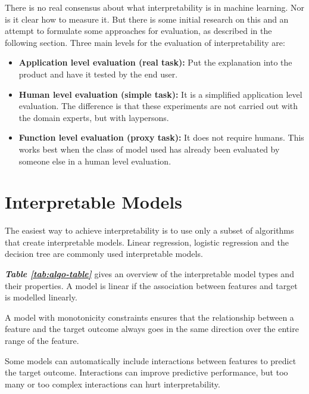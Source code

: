 \documentclass[a4paper, 10pt,]{JournalArticle}
\begin{document}
There is no real consensus about what interpretability is in machine learning. Nor is it clear how to measure it. But there is some initial research on this and an attempt to formulate some approaches for evaluation, as described in the following section.
Three main levels for the evaluation of interpretability are:

\begin{itemize}[] %
\item \textbf{Application level evaluation (real task):} Put the explanation into the product and have it tested by the end user.
\item \textbf{Human level evaluation (simple task):} It is a simplified application level evaluation. The difference is that these experiments are not carried out with the domain experts, but with laypersons.
\item \textbf{Function level evaluation (proxy task):} It does not require humans. This works best when the class of model used has already been evaluated by someone else in a human level evaluation.
\end{itemize}


\section{Interpretable Models}

The easiest way to achieve interpretability is to use only a subset of algorithms that create interpretable models. Linear regression, logistic regression and the decision tree are commonly used interpretable models.

\textbf{\textit{Table \ref{tab:algo-table}}} gives an overview of the interpretable model types and their properties. A model is linear if the association between features and target is modelled linearly.

A model with monotonicity constraints ensures that the relationship between a feature and the target outcome always goes in the same direction over the entire range of the feature.

Some models can automatically include interactions between features to predict the target outcome. Interactions can improve predictive performance, but too many or too complex interactions can hurt interpretability.
\end{document}
